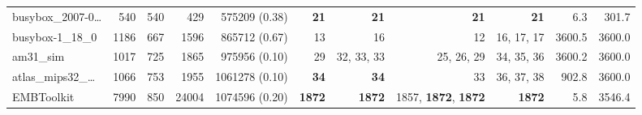 \begin{table*}
\begin{tiny}
{\begin{tabular}{lrrrrrrrrrr}
busybox\_2007-0\ldots & \num[text-series-to-math=true]{540} & \num[text-series-to-math=true]{540} & \num[text-series-to-math=true]{429} & \num[text-series-to-math=true]{575209} (\num[text-series-to-math=true]{0.38}) & \textbf{\num[text-series-to-math=true]{21}} & \textbf{\num[text-series-to-math=true]{21}} & \textbf{\num[text-series-to-math=true]{21}} & \textbf{\num[text-series-to-math=true]{21}} & 6.3 & 301.7\\
busybox-1\_18\_0 & \num[text-series-to-math=true]{1186} & \num[text-series-to-math=true]{667} & \num[text-series-to-math=true]{1596} & \num[text-series-to-math=true]{865712} (\num[text-series-to-math=true]{0.67}) & \num[text-series-to-math=true]{13} & \num[text-series-to-math=true]{16} & \num[text-series-to-math=true]{12} & \num[text-series-to-math=true]{16}, \num[text-series-to-math=true]{17}, \num[text-series-to-math=true]{17} & 3600.5 & 3600.0\\
am31\_sim & \num[text-series-to-math=true]{1017} & \num[text-series-to-math=true]{725} & \num[text-series-to-math=true]{1865} & \num[text-series-to-math=true]{975956} (\num[text-series-to-math=true]{0.10}) & \num[text-series-to-math=true]{29} & \num[text-series-to-math=true]{32}, \num[text-series-to-math=true]{33}, \num[text-series-to-math=true]{33} & \num[text-series-to-math=true]{25}, \num[text-series-to-math=true]{26}, \num[text-series-to-math=true]{29} & \num[text-series-to-math=true]{34}, \num[text-series-to-math=true]{35}, \num[text-series-to-math=true]{36} & 3600.2 & 3600.0\\
atlas\_mips32\_\ldots & \num[text-series-to-math=true]{1066} & \num[text-series-to-math=true]{753} & \num[text-series-to-math=true]{1955} & \num[text-series-to-math=true]{1061278} (\num[text-series-to-math=true]{0.10}) & \textbf{\num[text-series-to-math=true]{34}} & \textbf{\num[text-series-to-math=true]{34}} & \num[text-series-to-math=true]{33} & \num[text-series-to-math=true]{36}, \num[text-series-to-math=true]{37}, \num[text-series-to-math=true]{38} & 902.8 & 3600.0\\
EMBToolkit & \num[text-series-to-math=true]{7990} & \num[text-series-to-math=true]{850} & \num[text-series-to-math=true]{24004} & \num[text-series-to-math=true]{1074596} (\num[text-series-to-math=true]{0.20}) & \textbf{\num[text-series-to-math=true]{1872}} & \textbf{\num[text-series-to-math=true]{1872}} & \num[text-series-to-math=true]{1857}, \textbf{\num[text-series-to-math=true]{1872}}, \textbf{\num[text-series-to-math=true]{1872}} & \textbf{\num[text-series-to-math=true]{1872}} & 5.8 & 3546.4\\

\end{tabular}}
\end{tiny}
\end{table*}
